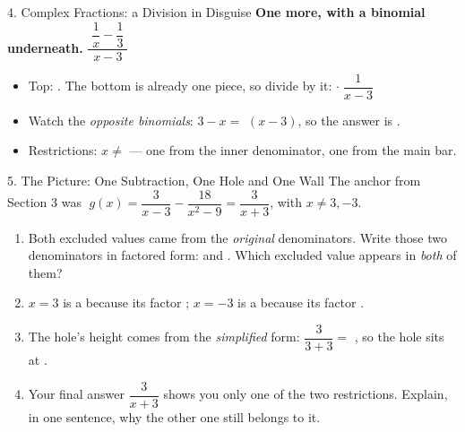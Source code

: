 \documentclass[10pt]{article}
\newcommand{\lgrid}[4]{%
  \draw[step=1, linegray!40, very thin] (#1,#3) grid (#2,#4);
  \draw[->, semithick, charcoal] (#1,0)--(#2,0) node[below right, font=\scriptsize]{$x$};
  \draw[->, semithick, charcoal] (0,#3)--(0,#4) node[left, font=\scriptsize]{$y$};}
\begin{document}
\begin{notesbox}{4. Complex Fractions: a Division in Disguise}
\vspace{5pt}
\textbf{One more, with a binomial underneath.} \;
$\dfrac{\;\dfrac{1}{x}-\dfrac{1}{3}\;}{\;x-3\;}$
\begin{itemize}[leftmargin=1.5em, itemsep=3pt]
  \item Top: \blank{1.8cm}. \; The bottom is already one piece, so divide by it:
        \blank{1.8cm} $\cdot\;\dfrac{1}{x-3}$
  \item Watch the \emph{opposite binomials}: $3-x=$ \blank{1.0cm} $(x-3)$, so the answer is
        \blank{1.8cm}.
  \item Restrictions: $x\neq$ \blank{1.6cm} --- one from the inner denominator, one from the main bar.
\end{itemize}
\end{notesbox}

\begin{notesbox}{5. The Picture: One Subtraction, One Hole and One Wall}
The anchor from Section 3 was $\;g(x)=\dfrac{3}{x-3}-\dfrac{18}{x^2-9}=\dfrac{3}{x+3}$, with
$x\neq3,-3$.
\begin{center}
\end{center}
\begin{enumerate}[leftmargin=1.7em, itemsep=3pt]
  \item Both excluded values came from the \emph{original} denominators. Write those two denominators
        in factored form: \blank{2.0cm} and \blank{2.6cm}. \; Which excluded value appears in
        \emph{both} of them? \blank{1.2cm}
  \item $x=3$ is a \blank{1.4cm} because its factor \blank{2.4cm}; \; $x=-3$ is a
        \blank{1.4cm} because its factor \blank{2.4cm}.
  \item The hole's height comes from the \emph{simplified} form: $\dfrac{3}{3+3}=$ \blank{1.0cm}, so
        the hole sits at \blank{1.6cm}.
  \item Your final answer $\dfrac{3}{x+3}$ shows you only one of the two restrictions. Explain, in one
        sentence, why the other one still belongs to it. \writeline
\end{enumerate}
\end{notesbox}
\end{document}
